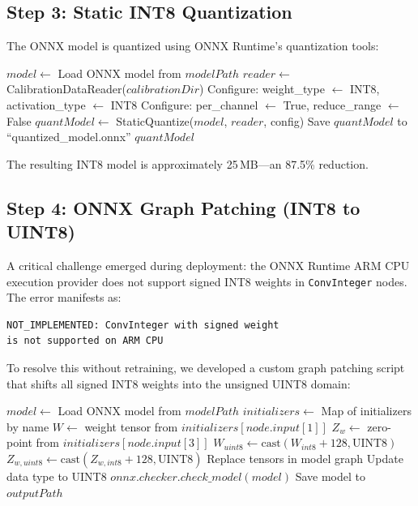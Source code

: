 \documentclass[11pt]{report}
\begin{document}
\subsection{Step 3: Static INT8 Quantization}
The ONNX model is quantized using ONNX Runtime's quantization tools:

\begin{algorithm}[H]
\caption{Static INT8 Quantization}
\begin{algorithmic}[1]
    \State $model \gets$ Load ONNX model from $modelPath$
    \State $reader \gets$ CalibrationDataReader($calibrationDir$)
    \State Configure: weight\_type $\gets$ INT8, activation\_type $\gets$ INT8
    \State Configure: per\_channel $\gets$ True, reduce\_range $\gets$ False
    \State $quantModel \gets$ StaticQuantize($model$, $reader$, config)
    \State Save $quantModel$ to ``quantized\_model.onnx''
    \State \Return $quantModel$
\EndFunction
\end{algorithmic}
\end{algorithm}

The resulting INT8 model is approximately 25\,MB---an 87.5\% reduction.

\subsection{Step 4: ONNX Graph Patching (INT8 to UINT8)}
A critical challenge emerged during deployment: the ONNX Runtime ARM CPU execution provider does not support signed INT8 weights in \texttt{ConvInteger} nodes. The error manifests as:
\begin{verbatim}
NOT_IMPLEMENTED: ConvInteger with signed weight 
is not supported on ARM CPU
\end{verbatim}

To resolve this without retraining, we developed a custom graph patching script that shifts all signed INT8 weights into the unsigned UINT8 domain:

\begin{algorithm}[H]
\caption{Fix INT8 to UINT8 Weights}
\begin{algorithmic}[1]
    \State $model \gets$ Load ONNX model from $modelPath$
    \State $initializers \gets$ Map of initializers by name
            \State $W \gets$ weight tensor from $initializers[node.input[1]]$
            \State $Z_w \gets$ zero-point from $initializers[node.input[3]]$
                \State $W_{uint8} \gets \text{cast}(W_{int8} + 128, \text{UINT8})$
                \State $Z_{w,uint8} \gets \text{cast}(Z_{w,int8} + 128, \text{UINT8})$
                \State Replace tensors in model graph
                \State Update data type to UINT8
            \EndIf
        \EndIf
    \EndFor
    \State $onnx.checker.check\_model(model)$
    \State Save model to $outputPath$
\EndFunction
\end{algorithmic}
\end{algorithm}
\end{document}

